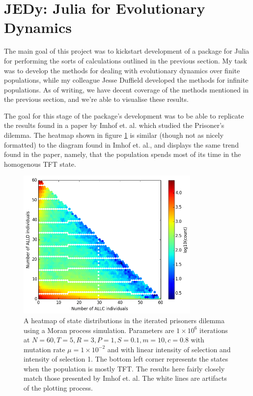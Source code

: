 \section{JEDy: Julia for Evolutionary Dynamics}

The main goal of this project was to kickstart development of a package for Julia for performing the sorts of calculations outlined in the previous section.
My task was to develop the methods for dealing with evolutionary dynamics over finite populations, while my colleague Jesse Duffield developed the methods for infinite populations.
As of writing, we have decent coverage of the methods mentioned in the previous section, and we're able to visualise these results.

The goal for this stage of the package's development was to be able to replicate the results found in a paper by Imhof et. al. \cite{imhofetal} which studied the Prisoner's dilemma.
The heatmap shown in figure \ref{heatmap} is similar (though not as nicely formatted) to the diagram found in Imhof et. al., and displays the same trend found in the paper, namely, that the population spends most of its time in the homogenous TFT state.

\begin{figure}[h]
    \centering
    \includegraphics[width = 0.8\textwidth]{graphics/heatmap}
    \caption{A heatmap of state distributions in the iterated prisoners dilemma using a Moran process simulation.
    Parameters are $1 \times 10^6$ iterations at $N = 60, T = 5, R = 3, P = 1, S = 0.1, m = 10, c = 0.8$ with mutation rate $\mu = 1 \times 10^{-2}$ and with linear intensity of selection and intensity of selection 1. The bottom left corner represents the states when the population is mostly TFT. The results here fairly closely match those presented by Imhof et. al. The white lines are artifacts of the plotting process.}
    \label{heatmap}
\end{figure}

